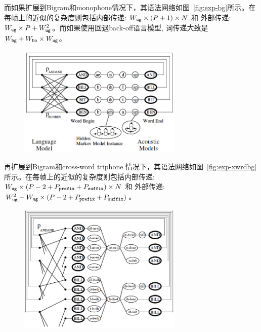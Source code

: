 而如果扩展到Bigram和monophone情况下，其语法网络如图~\ref{fig:exp-bg}所示。在每帧上的近似的复杂度则包括内部传递: $W_{\tt ug}\times (P+1)\times N$ 和 外部传递: $W_{\tt ug}\times P + W_{\tt ug}^2$。而如果使用回退back-off语言模型, 词传递大致是 $W_{\tt bg}+W_{\tt bo}\times W_{\tt ug}$。

\begin{figure}[!htp]
  \centering
    \captionstyle{\centering}
    \includegraphics[clip=true, width=0.7\textwidth]{figure/bg.png}
\end{figure}


再扩展到Bigram和cross-word triphone 情况下，其语法网络如图~\ref{fig:exp-xwrdbg}所示。在每帧上的近似的复杂度则包括内部传递: $W_{\tt ug}\times (P-2+ P_{\tt prefix}+ P_{\tt suffix})\times N$ 和 外部传递: $W_{\tt ug}^2 + W_{\tt ug}\times (P-2+ P_{\tt prefix}+ P_{\tt suffix})$。

\begin{figure}[!htp]
  \centering
    \captionstyle{\centering}
    \includegraphics[clip=true, width=0.7\textwidth]{figure/xwrdbg.png}
\end{figure}


